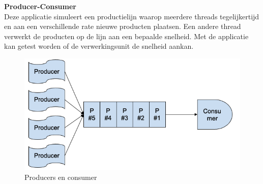\begin{oefening}
\textbf{Producer-Consumer}\\
Deze applicatie simuleert een productielijn waarop meerdere threads tegelijkertijd en aan een verschillende rate nieuwe producten plaatsen. Een andere thread verwerkt de producten op de lijn aan een bepaalde snelheid. Met de applicatie kan getest worden of de verwerkingsunit de snelheid aankan.
 
\begin{figure}[H]
\includegraphics[width=\linewidth]{images/h9/opgave_producer_consumer.png}
\caption{Producers en consumer}
\label{fig:producer_consumer}
\end{figure}


\end{oefening}
